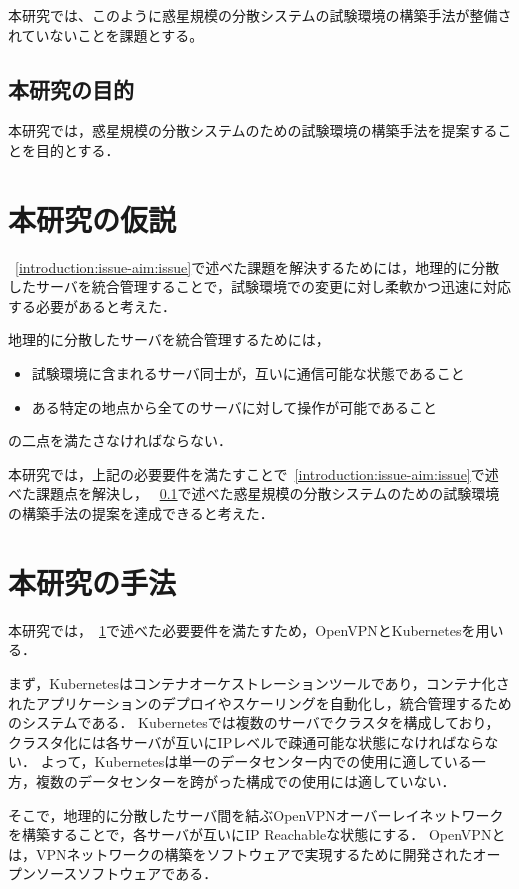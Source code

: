 本研究では、このように惑星規模の分散システムの試験環境の構築手法が整備されていないことを課題とする。

\subsection{本研究の目的}
\label{introduction:issue-aim:aim}

本研究では，惑星規模の分散システムのための試験環境の構築手法を提案することを目的とする．

\section{本研究の仮説}
\label{introduction:hypothesis}

~\ref{introduction:issue-aim:issue}で述べた課題を解決するためには，地理的に分散したサーバを統合管理することで，試験環境での変更に対し柔軟かつ迅速に対応する必要があると考えた．

地理的に分散したサーバを統合管理するためには，
\begin{itemize}
  \item 試験環境に含まれるサーバ同士が，互いに通信可能な状態であること
  \item ある特定の地点から全てのサーバに対して操作が可能であること
\end{itemize}
の二点を満たさなければならない．

本研究では，上記の必要要件を満たすことで~\ref{introduction:issue-aim:issue}で述べた課題点を解決し，
~\ref{introduction:issue-aim:aim}で述べた惑星規模の分散システムのための試験環境の構築手法の提案を達成できると考えた．

\section{本研究の手法}
\label{introduction:proposal}

本研究では，~\ref{introduction:hypothesis}で述べた必要要件を満たすため，OpenVPNとKubernetesを用いる．

まず，Kubernetesはコンテナオーケストレーションツールであり，コンテナ化されたアプリケーションのデプロイやスケーリングを自動化し，統合管理するためのシステムである．
Kubernetesでは複数のサーバでクラスタを構成しており，クラスタ化には各サーバが互いにIPレベルで疎通可能な状態になければならない．
よって，Kubernetesは単一のデータセンター内での使用に適している一方，複数のデータセンターを跨がった構成での使用には適していない．

そこで，地理的に分散したサーバ間を結ぶOpenVPNオーバーレイネットワークを構築することで，各サーバが互いにIP Reachableな状態にする．
OpenVPNとは，VPNネットワークの構築をソフトウェアで実現するために開発されたオープンソースソフトウェアである．

